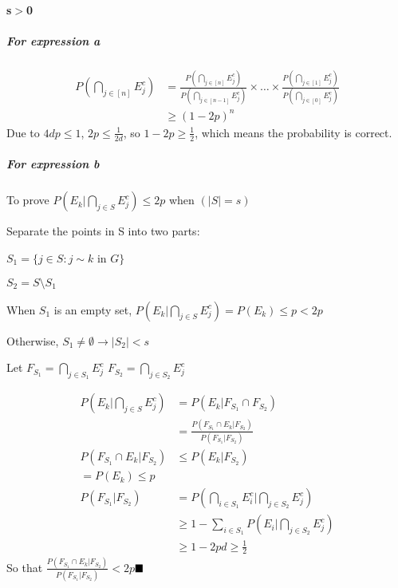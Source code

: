 \documentclass{article}
\begin{document}
\paragraph{s$>$0}\par
\subparagraph{For expression a}
\begin{align*}
  P\left(\bigcap_{j \in [n]}E_{j}^{c}\right) &= \frac{P\left(\bigcap_{j \in [n]}E_{j}^{c}\right)}{P\left(\bigcap_{j \in [n-1]}E_{j}^{c}\right)}\times\dots\times\frac{P\left(\bigcap_{j \in [1]}E_{j}^{c}\right)}{P\left(\bigcap_{j \in [0]}E_{j}^{c}\right)}\\
  &\geq (1-2p)^n
\end{align*}
Due to $4dp\leq1$, $2p\leq \frac{1}{2d}$, so $1-2p \geq \frac{1}{2}$, which means the probability is correct.\par
\subparagraph{For expression b}To prove $P\left(E_k\big|\bigcap_{j\in S}E_{j}^{c}\right)\leq 2p$ when $(|S| = s)$\par
Separate the points in S into two parts:\par
$S_1 = \{j\in S: j\sim k$ in $G\}$\par
$S_2 = S \setminus S_1$\par
When $S_1$ is an empty set, $P(E_k|\bigcap_{j\in S}E_j^{c})=P(E_k)\leq p < 2p$\par
Otherwise, $S_1 \neq \emptyset \rightarrow |S_2|<s$\par
Let $F_{S_1} = \bigcap_{j\in S_1} E_{j}^{c}$  $F_{S_2} = \bigcap_{j\in S_2} E_{j}^{c}$\par
\begin{align*}
P\left(E_k\Big|\bigcap_{j\in S}E_{j}^{c}\right) &= P\left(E_k|F_{S_1}\cap F_{S_2}\right)\\
&=\frac{P\left(F_{S_1}\cap E_k|F_{S_2}\right)}{P\left(F_{S_1}|F_{S_2}\right)}\\
P\left(F_{S_1}\cap E_k|F_{S_2}\right) &\leq P\left( E_k|F_{S_2}\right) \\= P\left( E_k\right)\leq p\\
P\left(F_{S_1}|F_{S_2}\right)&=P\left(\bigcap_{i \in S_1}E_{i}^{c}\Big|\bigcap_{j \in S_2}E_{j}^{c}\right)\\
&\geq 1-\sum_{i\in S_1}P\left(E_i\Big|\bigcap_{j \in S_2}E_{j}^{c}\right)\\
&\geq1-2pd \geq \frac{1}{2}
\end{align*}
So that $\frac{P\left(F_{S_1}\cap E_k|F_{S_2}\right)}{P\left(F_{S_1}|F_{S_2}\right)} < 2p$$\hfill\blacksquare$ 
\end{document}
